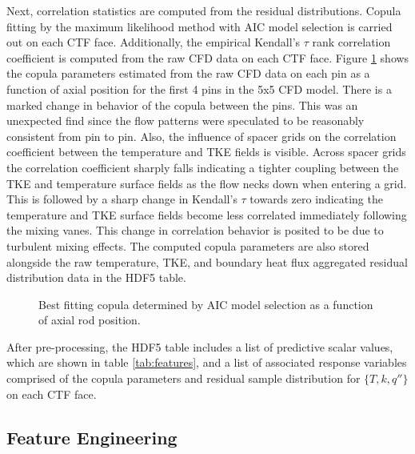 Next, correlation statistics are computed from the residual distributions.
Copula fitting by the maximum likelihood method with AIC model selection is carried out on each CTF face.  Additionally, the empirical Kendall's $\tau$ rank correlation coefficient is computed from the raw CFD data on each CTF face. Figure \ref{fig:copula_predicted} shows the copula parameters estimated from the raw CFD data on each pin as a function of axial position for the first 4 pins in the 5x5 CFD model.  There is a marked change in behavior of the copula between the pins.  This was an unexpected find since the flow patterns were speculated to be reasonably consistent from pin to pin.  Also, the influence of spacer grids on the correlation coefficient between the temperature and TKE fields is visible.  Across spacer grids the correlation coefficient sharply falls indicating a tighter coupling between the TKE and temperature surface fields as the flow necks down when entering a grid.  This is followed by a sharp change in Kendall's $\tau$ towards zero indicating the temperature and TKE surface fields become less correlated immediately following the mixing vanes.  This change in correlation behavior is posited to be due to turbulent mixing effects.  The computed copula parameters are also stored alongside the raw temperature, TKE, and boundary heat flux aggregated residual distribution data in the HDF5 table.

\begin{figure}[H]%
    \centering
    \qquad
    \qquad
    \qquad
    \qquad
    \caption[Best fitting copula to CFD data.]{Best fitting copula determined by AIC model selection as a function of axial rod position.}%
    \label{fig:copula_predicted}%
\end{figure}

After pre-processing, the HDF5 table includes a list of predictive scalar values, which are shown in table \ref{tab:features}, and a list of associated response variables comprised of the copula parameters and residual sample distribution for $\{T,k,q''\}$ on each CTF face.

\subsection{Feature Engineering}

